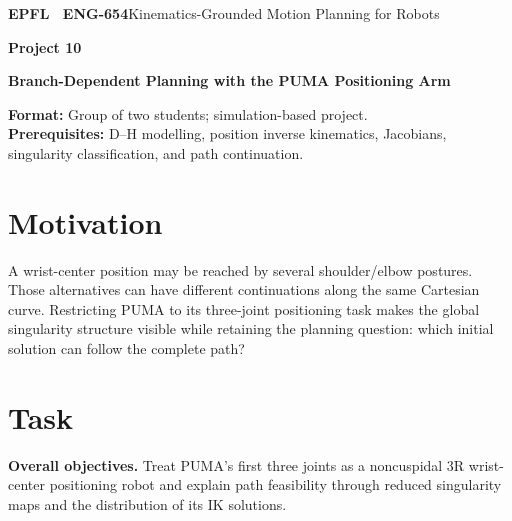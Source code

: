 \documentclass[11pt,a4paper]{article}
\begin{document}
{\small\textbf{EPFL \textbar\ ENG-654}\hfill Kinematics-Grounded Motion Planning for Robots}
\vspace{5mm}

{\color{epflred}\Large\bfseries Project 10}

{\LARGE\bfseries Branch-Dependent Planning with the PUMA Positioning Arm\par}

\textbf{Format:} Group of two students; simulation-based project.\\
\textbf{Prerequisites:} D--H modelling, position inverse kinematics,
Jacobians, singularity classification, and path continuation.

\section*{Motivation}
A wrist-center position may be reached by several shoulder/elbow postures.
Those alternatives can have different continuations along the same Cartesian
curve. Restricting PUMA to its three-joint positioning task makes the global
singularity structure visible while retaining the planning question: which
initial solution can follow the complete path?

\section*{Task}
\textbf{Overall objectives.} Treat PUMA's first three joints as a noncuspidal 3R wrist-center positioning
robot and explain path feasibility through reduced singularity maps and the
distribution of its IK solutions.
\end{document}
